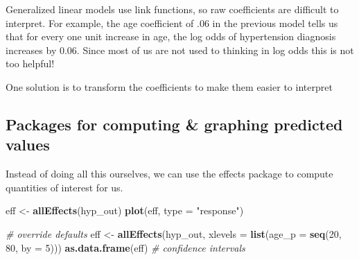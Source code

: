 \documentclass[]{book}
\newenvironment{Shaded}{\begin{snugshade}}{\end{snugshade}}
\newcommand{\KeywordTok}[1]{\textcolor[rgb]{0.13,0.29,0.53}{\textbf{#1}}}
\newcommand{\DataTypeTok}[1]{\textcolor[rgb]{0.13,0.29,0.53}{#1}}
\newcommand{\DecValTok}[1]{\textcolor[rgb]{0.00,0.00,0.81}{#1}}
\newcommand{\StringTok}[1]{\textcolor[rgb]{0.31,0.60,0.02}{#1}}
\newcommand{\CommentTok}[1]{\textcolor[rgb]{0.56,0.35,0.01}{\textit{#1}}}
\newcommand{\OperatorTok}[1]{\textcolor[rgb]{0.81,0.36,0.00}{\textbf{#1}}}
\newcommand{\NormalTok}[1]{#1}
\begin{document}
Generalized linear models use link functions, so raw coefficients are
difficult to interpret. For example, the age coefficient of .06 in the
previous model tells us that for every one unit increase in age, the log
odds of hypertension diagnosis increases by 0.06. Since most of us are
not used to thinking in log odds this is not too helpful!

One solution is to transform the coefficients to make them easier to
interpret

\begin{Shaded}
\end{Shaded}

\subsection{Packages for computing \& graphing predicted
values}\label{packages-for-computing-graphing-predicted-values}

Instead of doing all this ourselves, we can use the effects package to
compute quantities of interest for us.

\begin{Shaded}
\begin{Highlighting}[]
\NormalTok{  eff <-}\StringTok{ }\KeywordTok{allEffects}\NormalTok{(hyp_out)}
  \KeywordTok{plot}\NormalTok{(eff, }\DataTypeTok{type =} \StringTok{"response"}\NormalTok{)}

  \CommentTok{# override defaults}
\NormalTok{  eff <-}\StringTok{ }\KeywordTok{allEffects}\NormalTok{(hyp_out, }\DataTypeTok{xlevels =} \KeywordTok{list}\NormalTok{(}\DataTypeTok{age_p =} \KeywordTok{seq}\NormalTok{(}\DecValTok{20}\NormalTok{, }\DecValTok{80}\NormalTok{, }\DataTypeTok{by =} \DecValTok{5}\NormalTok{)))}
  \KeywordTok{as.data.frame}\NormalTok{(eff) }\CommentTok{# confidence intervals}
\end{Highlighting}
\end{Shaded}
\end{document}

